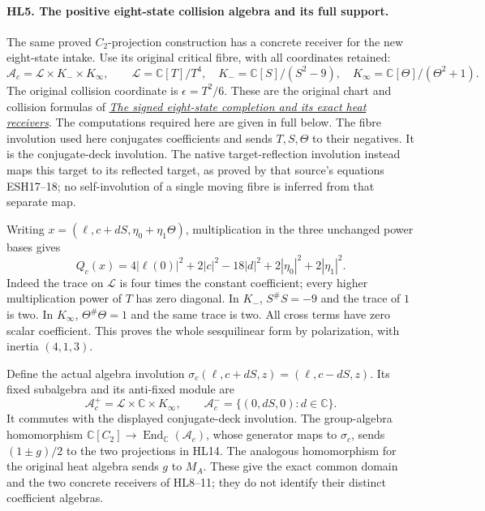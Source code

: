 \paragraph{HL5. The positive eight-state collision algebra and its full support.}
The same proved $C_2$-projection construction has a concrete receiver
for the new eight-state intake. Use its original critical fibre,
with all coordinates retained:
\[
 \mathcal A_c=\mathcal L\times K_-\times K_\infty,\qquad
 \mathcal L=\mathbb C[T]/T^4,\quad
 K_-=\mathbb C[S]/(S^2-9),\quad
 K_\infty=\mathbb C[\Theta]/(\Theta^2+1).
 \tag{HL12}
\]
The original collision coordinate is $\epsilon=T^2/6$.
These are the original chart and collision formulas of
\href{https://github.com/KokunoYumeto/zeta-function-research-reader/blob/64a77de144720ea9e07943d6ed6f63a178d462cf/workbenches/splitzero-tandem/branches/tau-zero-prime-positivity/EIGHT_STATE_HEAT_COMPARISON.md}{\emph{The signed eight-state completion and its exact heat receivers}}.
The computations required here are given in full below.
The fibre involution used here conjugates coefficients and sends
$T,S,\Theta$ to their negatives. It is the conjugate-deck involution.
The native target-reflection involution instead maps this target
to its reflected target, as proved by that source's equations
ESH17--18; no self-involution of a single moving fibre is inferred
from that separate map.

Writing $x=(\ell,c+dS,\eta_0+\eta_1\Theta)$, multiplication
in the three unchanged power bases gives
\[
 Q_c(x)=4|\ell(0)|^2+2|c|^2-18|d|^2
                         +2|\eta_0|^2+2|\eta_1|^2.
 \tag{HL13}
\]
Indeed the trace on $\mathcal L$ is four times the constant
coefficient; every higher multiplication power of $T$ has zero
diagonal. In $K_-$, $S^\#S=-9$ and the trace of $1$ is two.
In $K_\infty$, $\Theta^\#\Theta=1$ and the same trace is two.
All cross terms have zero scalar coefficient. This proves the
whole sesquilinear form by polarization, with inertia $(4,1,3)$.

Define the actual algebra involution
$\sigma_c(\ell,c+dS,z)=(\ell,c-dS,z)$.
Its fixed subalgebra and its anti-fixed module are
\[
 \mathcal A_c^+=\mathcal L\times\mathbb C\times K_\infty,
 \qquad \mathcal A_c^-=\{(0,dS,0):d\in\mathbb C\}.
 \tag{HL14}
\]
It commutes with the displayed conjugate-deck involution.
The group-algebra homomorphism
$\mathbb C[C_2]\to\operatorname{End}_{\mathbb C}(\mathcal A_c)$,
whose generator maps to $\sigma_c$, sends $(1\pm g)/2$ to
the two projections in HL14. The analogous homomorphism for
the original heat algebra sends $g$ to $M_A$. These give the
exact common domain and the two concrete receivers of HL8--11;
they do not identify their distinct coefficient algebras.

